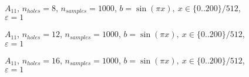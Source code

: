 \begin{figure}[!h]
	\begin{minipage}[t]{0.65\columnwidth}%
	\end{minipage}\hfill{}%
	\begin{minipage}[t]{0.35\columnwidth}%
	\end{minipage}\caption{$A_{11}$, $n_{holes}=8$, $n_{samples}=1000$, $b=\sin(\pi x),\ x\in\{0..200\}/512$,
		$\varepsilon=1$}
\end{figure}

\begin{figure}[!h]
	\begin{minipage}[t]{0.65\columnwidth}%
	\end{minipage}\hfill{}%
	\begin{minipage}[t]{0.35\columnwidth}%
	\end{minipage}\caption{$A_{11}$, $n_{holes}=12$, $n_{samples}=1000$, $b=\sin(\pi x),\ x\in\{0..200\}/512$,
		$\varepsilon=1$}
\end{figure}

\begin{figure}[!h]
	\begin{minipage}[t]{0.65\columnwidth}%
	\end{minipage}\hfill{}%
	\begin{minipage}[t]{0.35\columnwidth}%
	\end{minipage}\caption{$A_{11}$, $n_{holes}=16$, $n_{samples}=1000$, $b=\sin(\pi x),\ x\in\{0..200\}/512$,
		$\varepsilon=1$}
\end{figure}
